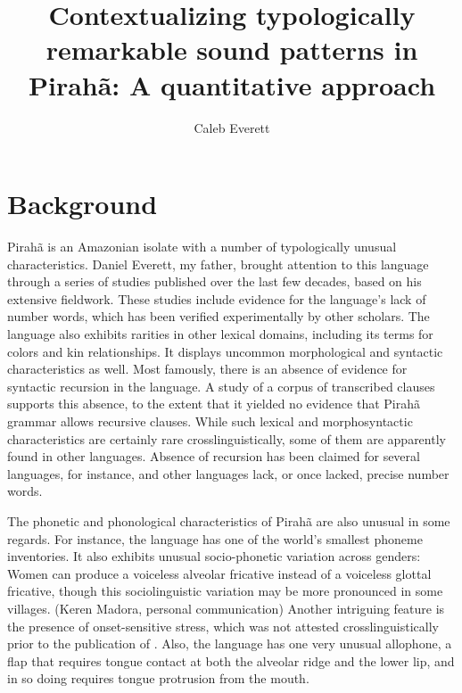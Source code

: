 \documentclass[output=paper,colorlinks,citecolor=brown
]{langscibook}
\title{Contextualizing typologically remarkable sound patterns in Pirahã: A quantitative approach}
\author{Caleb Everett}
\date{}
\begin{document}
\label{chap-13_everett}

\maketitle
\abstract

\section{Background}
    Pirahã is an Amazonian isolate with a number of typologically unusual characteristics. Daniel Everett, my father, brought attention to this language through a series of studies published over the last few decades, based on his extensive fieldwork. \cite{everett1982phonetic, everett1984relevance,everett1986piraha,everett2001monolingual} These studies include evidence for the language's lack of number words, which has been verified experimentally by other scholars.\cite{frank2008number, everett2012quantity} The language also exhibits rarities in other lexical domains, including its terms for colors and kin relationships.\cite{everett2005cultural} It displays uncommon morphological and syntactic characteristics as well.\cite{thomason2001pronoun, everett2012language} Most famously, there is an absence of evidence for syntactic recursion in the language.\cite{everett2005cultural} A study of a corpus of transcribed clauses supports this absence, to the extent that it yielded no evidence that Pirahã grammar allows recursive clauses.\cite{futrell2016corpus} While such lexical and morphosyntactic characteristics are certainly rare crosslinguistically, some of them are apparently found in other languages. Absence of recursion has been claimed for several languages, for instance, and other languages lack, or once lacked, precise number words.\cite{pullum2020theorizing, everett2017numbers}
    
    The phonetic and phonological characteristics of Pirahã are also unusual in some regards. For instance, the language has one of the world’s smallest phoneme inventories.\cite{everett2009piraha} It also exhibits unusual socio-phonetic variation across genders: Women can produce a voiceless alveolar fricative instead of a voiceless glottal fricative, though this sociolinguistic variation may be more pronounced in some villages. (Keren Madora, personal communication) Another intriguing feature is the presence of onset-sensitive stress, which was not attested crosslinguistically prior to the publication of \cite{everett1984relevance}. Also, the language has one very unusual allophone, a flap that requires tongue contact at both the alveolar ridge and the lower lip, and in so doing requires tongue protrusion from the mouth.\cite{everett1982phonetic}
\end{document}
